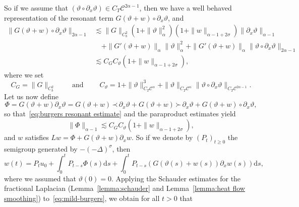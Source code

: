 \documentclass[a4paper,11pt]{article}
\newcommand{\mathd}{\mathrm{d}}
\newcommand{\tmop}[1]{\ensuremath{\operatorname{#1}}}
\theoremstyle{remark}
\newcommand{\CC}{\ensuremath{\mathscr{C}}}
\newcommand{\lpara}{\,\mathord{\prec}\,}
\newcommand{\rpara}{\,\mathord{\succ}\,}
\newcommand{\reso}{\,\mathord{\circ}\,}
\begin{document}
So if we assume that $( \vartheta \reso \partial_{x} \vartheta ) \in C_{T} \CC^{2 \alpha -1}$, then we have a well behaved representation of the resonant
term $G ( \vartheta +w ) \reso \partial_{x} \vartheta$, and
\begin{align}\label{eq:burgers resonant estimate} \nonumber
   \| G ( \vartheta +w ) \reso \partial_{x} \vartheta \|_{2 \alpha -1} & \lesssim \| G \|_{C^{2}_{b}} ( 1+ \| \vartheta \|^{2}_{\alpha})(1 + \| w \|_{\alpha -1+2 \sigma} ) \| \partial_{x} \vartheta \|_{\alpha -1}\\ \nonumber
   &\quad + \| G'( \vartheta +w ) \|_{\alpha} \| \vartheta \|_{\alpha}^{2} + \| G' ( \vartheta +w ) \|_{\alpha} \| \vartheta \reso \partial_{x} \vartheta \|_{2 \alpha -1}\\
   & \lesssim C_{G} C_{\vartheta} ( 1+ \| w \|_{\alpha -1+2 \sigma} ) ,
\end{align}
where we set
\[
   C_{G} = \| G \|_{C^{2}_{b}} \hspace{2em} \tmop{and} \hspace{2em}  C_{\vartheta} = 1+ \| \vartheta \|_{C_T \CC^\alpha}^{3} + \|\vartheta\|_{C_T\CC^\alpha} \| \vartheta \reso \partial_{x} \vartheta \|_{C_T\CC^{2 \alpha -1}}.
\]
Let us now define
\[
   \Phi = G(\vartheta + w) \partial_x \vartheta = G ( \vartheta +w ) \lpara \partial_{x} \vartheta +G ( \vartheta +w ) \rpara \partial_{x} \vartheta +G ( \vartheta +w ) \reso \partial_{x} \vartheta ,
\]
so that~{\eqref{eq:burgers resonant estimate}} and the paraproduct estimates yield
\begin{equation}\label{eq:burgers phi-estimate}
   \| \Phi \|_{\alpha -1} \lesssim C_{G}C_{\vartheta} ( 1+ \| w \|_{\alpha -1+2 \sigma} ) ,
\end{equation}
and $w$ satisfies $L w= \Phi +G ( \vartheta +w ) \partial_{x} w$. So if we denote by $( P_{t} )_{t \geqslant 0}$ the semigroup generated by $- (- \Delta )^{\sigma}$, then
\begin{equation}\label{eq:mild-burgers}
  w ( t ) =P_{t} u_{0} + \int_{0}^{t} P_{t-s} \Phi ( s ) \mathd s+ \int_{0}^{t} P_{t-s} ( G ( \vartheta ( s ) +w ( s ) ) \partial_{x} w ( s ) ) \mathd s,
\end{equation}
where we assumed that $\vartheta(0) = 0$. Applying the Schauder estimates for the fractional Laplacian (Lemma~\ref{lemma:schauder} and Lemma~\ref{lemma:heat flow smoothing}) to~{\eqref{eq:mild-burgers}}, we obtain for all $t>0$ that
\end{document}
